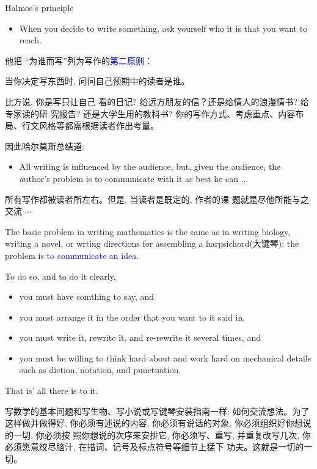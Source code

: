 \documentclass[12pt]{ctexbeamer}
\newcommand{\blue}[1]{\textcolor{blue}{#1}}
\begin{document}
\begin{frame}{Halmos's principle}

\begin{itemize}
\item When you decide to write something, ask yourself who it is that you want to reach.
\end{itemize}
\pause
 {\small
他把 “为谁而写”列为写作的\blue{第二原则}：
\begin{center}
当你决定写东西时, 问问自己预期中的读者是谁。
\end{center}


 比方说, 你是写只让自己 看的日记? 给远方朋友的信？还是给情人的浪漫情书? 给专家读的研 究报告? 还是大学生用的教科书? 你的写作方式、考虑重点、内容布 局、行文风格等都需根据读者作出考量。

因此哈尔莫斯总结道:}

\begin{itemize}
    \item
All writing is influenced by the audience, but, given the audience, the author's problem is to communicate with it as best he can ...
\end{itemize}
\pause

 {\small
所有写作都被读者所左右。但是, 当读者是既定的, 作者的课 题就是尽他所能与之交流 $\cdots$
}
\end{frame}
\begin{frame}
    {\small
    The basic problem in writing mathematics is the same as in writing biology, writing a novel, or wrting directions for assembling a harpsichord(大键琴):
        the problem is \blue{to communicate an idea}.

    To do so, and to do it clearly,
    \begin{itemize}
        \item you must have somthing to say, and
        \item you must arrange it in the order that you want to it said in,
        \item you must write it, rewrite it, and re-rewrite it  several times, and
        \item you must be willing to think hard about and work hard on mechanical details such as diction, notation, and punctuation.
    \end{itemize}
    That is' all there is to it.
}

  \pause
{\small
写数学的基本问题和写生物、写小说或写键琴安装指南一样: 如何交流想法。为了这样做并做得好, 你必须有述说的内容, 你必须有说话的对象, 你必须组织好你想说的一切, 你必须按 照你想说的次序来安排它, 你必须写、重写, 并重复改写几次, 你必须愿意绞尽脑汁, 在措词、记号及标点符号等细节上猛下 功夫。这就是一切的一切。 }
\end{frame}
\end{document}
